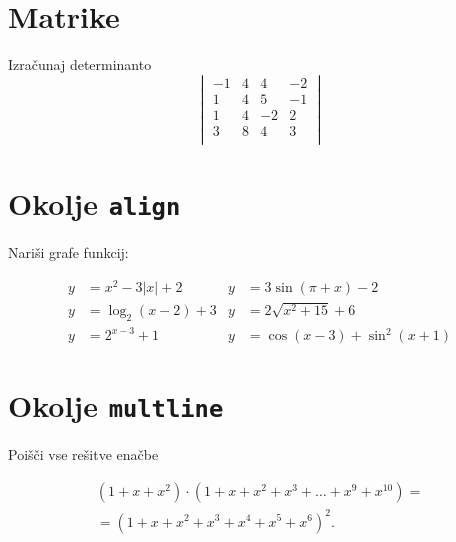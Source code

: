 \documentclass[a4paper,12pt]{article}
\begin{document}
\section*{Matrike}
Izračunaj determinanto
\begin{equation*}
\begin{vmatrix}
    -1 & 4 & 4 & -2 \\
    1 & 4 & 5 & -1 \\
    1 & 4 & -2 & 2 \\
    3 & 8 & 4 & 3 \\
\end{vmatrix}
\end{equation*}

\section*{Okolje \texttt{align}}
Nariši grafe funkcij:

\begin{align*}
   y &= x^2 - 3|x| + 2  &  y &= 3 \sin(\pi+x) - 2 \\
   y &= \log_2(x-2) + 3 & y &= 2 \sqrt{x^2+15} + 6 \\
   y &= 2^{x-3} + 1     & y &= \cos(x-3) + \sin^2(x+1)
\end{align*}


\section*{Okolje \texttt{multline}}
Poišči vse rešitve enačbe

\begin{multline*}
(1+x+x^2) \cdot (1+x+x^2+x^3+\ldots+x^9+x^{10}) = \\
=(1+x+x^2+x^3+x^4+x^5+x^6)^2.
\end{multline*}
\end{document}
